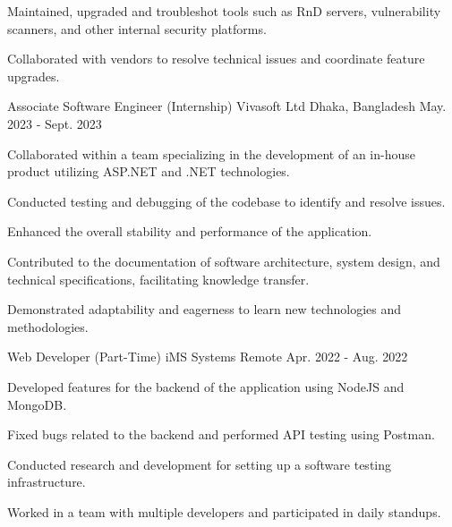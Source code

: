 \begin{cventries}
{\begin{cvitems}
        \item Maintained, upgraded and troubleshot tools such as RnD servers, vulnerability scanners, and other internal security platforms.
        \item Collaborated with vendors to resolve technical issues and coordinate feature upgrades.
      \end{cvitems}
    }
  \cventry
    {Associate Software Engineer (Internship)} %
    {Vivasoft Ltd} %
    {Dhaka, Bangladesh} %
    {May. 2023 - Sept. 2023} %
    {
      \begin{cvitems} %
        \item Collaborated within a team specializing in the development of an in-house product utilizing ASP.NET and .NET technologies.
        \item Conducted testing and debugging of the codebase to identify and resolve issues.
        \item Enhanced the overall stability and performance of the application.
        \item Contributed to the documentation of software architecture, system design, and technical specifications, facilitating knowledge transfer.
        \item Demonstrated adaptability and eagerness to learn new technologies and methodologies.
      \end{cvitems}
    }
  \vspace{10pt}
  \cventry
    {Web Developer (Part-Time)} %
    {iMS Systems} %
    {Remote} %
    {Apr. 2022 - Aug. 2022} %
    {
      \begin{cvitems} %
        \item Developed features for the backend of the application using NodeJS and MongoDB.
        \item Fixed bugs related to the backend and performed API testing using Postman.
        \item Conducted research and development for setting up a software testing infrastructure.
        \item Worked in a team with multiple developers and participated in daily standups.
      \end{cvitems}
    }

\end{cventries}
